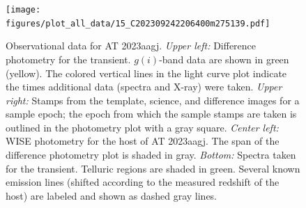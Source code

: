 \documentclass[twocolumn]{aastex631}
\begin{document}
\begin{figure}
    \centering
    \texttt{[image: figures/plot\_all\_data/15\_C202309242206400m275139.pdf]}
    \caption{
        Observational data for AT 2023aagj.
        \textit{Upper left:} Difference photometry for the transient.
        $g(i)$-band data are shown in green (yellow). %
        The colored vertical lines in the light curve plot indicate the times additional data (spectra and X-ray) were taken.
        \textit{Upper right:} Stamps from the template, science, and difference images for a sample epoch; the epoch from which the sample stamps are taken is outlined in the photometry plot with a gray square.
        \textit{Center left:}
        WISE photometry for the host of AT 2023aagj.
        The span of the difference photometry plot is shaded in gray.
        \textit{Bottom:} Spectra taken for the transient.
        Telluric regions are shaded in green.
        Several known emission lines (shifted according to the measured redshift of the host) are labeled and shown as dashed gray lines.
    }
    \label{fig:C202309242206400m275139}
\end{figure}
\end{document}
